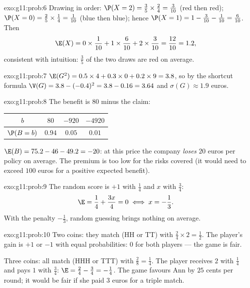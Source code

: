 \begin{solution}{exo:g11:prob:6}
Drawing in order: $\P(X = 2) = \frac35 \times \frac24 = \frac{3}{10}$
(red then red); $\P(X = 0) = \frac25 \times \frac14 = \frac{1}{10}$
(blue then blue); hence
$\P(X = 1) = 1 - \frac{3}{10} - \frac{1}{10} = \frac{6}{10}$. Then
\[
\E(X) = 0 \times \frac1{10} + 1 \times \frac6{10} + 2 \times \frac3{10}
= \frac{12}{10} = 1.2 ,
\]
consistent with intuition: $\frac35$ of the two draws are red on average.
\end{solution}

\begin{solution}{exo:g11:prob:7}
$\E(G^2) = 0.5 \times 4 + 0.3 \times 0 + 0.2 \times 9 = 3.8$, so by the
shortcut formula
$\V(G) = 3.8 - (-0.4)^2 = 3.8 - 0.16 = 3.64$ and
$\sigma(G) \approx 1.9$ euros.
\end{solution}

\begin{solution}{exo:g11:prob:8}
The benefit is $80$ minus the claim:
\begin{center}
\begin{tabular}{c|ccc}
$b$ & $80$ & $-920$ & $-4920$\\
\hline
$\P(B=b)$ & $0.94$ & $0.05$ & $0.01$
\end{tabular}
\end{center}
$\E(B) = 75.2 - 46 - 49.2 = -20$: at this price the company \emph{loses}
$20$ euros per policy on average. The premium is too low for the risks
covered (it would need to exceed $100$ euros for a positive expected
benefit).
\end{solution}

\begin{solution}{exo:g11:prob:9}
The random score is $+1$ with  $\frac14$ and $x$ with
 $\frac34$:
\[
\E = \frac14 + \frac{3x}{4} = 0 \iff x = -\frac13 .
\]
With the penalty $-\frac13$, random guessing brings nothing on average.
\end{solution}

\begin{solution}{exo:g11:prob:10}
Two coins: they match (HH or TT) with  $\frac24 \times 2 =
\frac12$. The player's gain is $+1$ or $-1$ with equal probabilities:
 $0$ for both players --- the game is fair.

Three coins: all match (HHH or TTT) with  $\frac{2}{8} =
\frac14$. The player receives $2$ with  $\frac14$ and pays $1$
with  $\frac34$:
$\E = \frac24 - \frac34 = -\frac14$. The game favours Ann by $25$ cents
per round; it would be fair if she paid $3$ euros for a triple match.
\end{solution}

